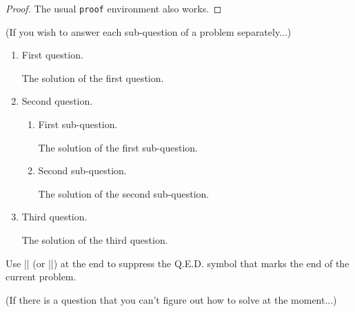 \documentclass[11pt,
  logo = {example-image},
  title in boldface,
  theorem in new line,
  colored solution,
]{homework}
\begin{document}
\begin{proof}
    The usual \verb|proof| environment also works.
\end{proof}


\bigskip\textcolor{gray!55}{(If you wish to answer each sub-question of a problem separately...)}

\begin{problem}
    \begin{enumerate}[itemsep=.5\baselineskip]
        \item First question.

        \begin{solution}
            The solution of the first question.
        \end{solution}

        \item Second question.

        \begin{enumerate}[itemsep=.3\baselineskip]
            \item First sub-question.

            \begin{solution}
                The solution of the first sub-question.
            \end{solution}

            \item Second sub-question.

            \begin{solution}
                The solution of the second sub-question.
            \end{solution}

        \end{enumerate}

        \item Third question.

        \begin{solution}
            The solution of the third question.
        \end{solution}

    \end{enumerate}
    Use \cverb|\noqed| (or \cverb|\noQED|) at the end to suppress the Q.E.D. symbol that marks the end of the current problem.
    \noQED
\end{problem}


\bigskip\textcolor{gray!55}{(If there is a question that you can't figure out how to solve at the moment...)}

\end{document}

